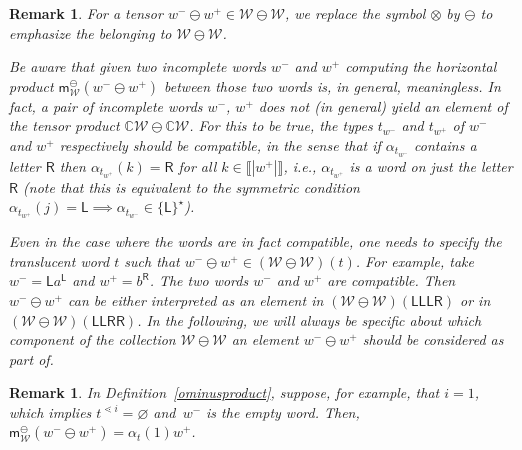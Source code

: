 \documentclass[pdftex]{sigma}
\newcommand{\interval}[1]{\llbracket #1 \rrbracket}
\newcommand{\stdl}{\lessdot}
\newcommand\IWc{\mathcal{W}}
\newcommand\mS{\mathsf{m}^{\ominus}_{\IWc}}
\newcommand\LL{{\mathsf{L}}}
\newcommand\RR{{\mathsf{R}}}
\def\CC{\mathbb{C}}
\numberwithin{equation}{section}
\newtheorem{Remark}[Theorem]{Remark}
\begin{document}
\begin{Remark}\label{rk:cmphorieontalmult}
For a tensor $w^{-}\ominus w^{+} \in \IWc\ominus \IWc$, we replace the symbol $\otimes$ by $\ominus$ to emphasize the belonging to $\IWc\ominus \IWc$.

Be aware that given two incomplete words $w^{-}$ and $w^{+}$ computing the horizontal product $\mS(w^{-}\ominus w^{+})$ between those two words is, in general, meaningless.
In fact, a pair of incomplete words $w^-$, $w^+$ does not (in general) yield an element of the tensor product $\CC\IWc\ominus\CC\IWc$. For this to be true, the types $t_{w^-}$ and $t_{w^+}$ of $w^-$ and $w^{+}$ respectively should be {\it compatible}, in the sense that if $\alpha_{t_{w^-}}$ contains a letter ${\RR}$ then $\alpha_{t_{w^{+}}}(k)=\RR$ for all $k\in \interval{|w^+|}$, i.e., $\alpha_{t_{w^+}}$ is a word on just the letter $\RR$ (note that this is equivalent to the symmetric condition $\alpha_{t_{w^+}}(j)=\LL\implies \alpha_{t_{w^-}}\in\{\LL\}^\star$).

Even in the case where the words \emph{are} in fact compatible,
one needs to specify the translucent word $t$ such that $w^{-}\ominus w^{+} \in (\IWc\ominus \IWc) (t)$.
For example, take $w^{-}={\LL}a^{\LL}$ and $w^{+}=b^{\RR}$. The two words $w^{-}$ and $w^{+}$ are compatible. Then $w^{-}\ominus w^{+}$ can be either interpreted as an element in $(\IWc\ominus \IWc)(\LL\LL\LL\RR)$ or in $(\IWc\ominus \IWc)(\LL\LL\RR\RR)$. In the following, we will always be specific about which component of the collection $\IWc\ominus \IWc$ an element $w^{-}\ominus w^{+}$ should be considered as part of.
\end{Remark}
\begin{Remark}
	In Definition~\ref{ominusproduct}, suppose, for example, that $i=1$, which implies $t^{\stdl i}=\varnothing$ and~$w^{-}$ is the empty word. Then, $\mS(w^{-}\ominus w^{+})=\alpha_t(1)w^{+}$.
\end{Remark}

\newcommand\us[2]{\underset{#1}{#2}}
\end{document}
